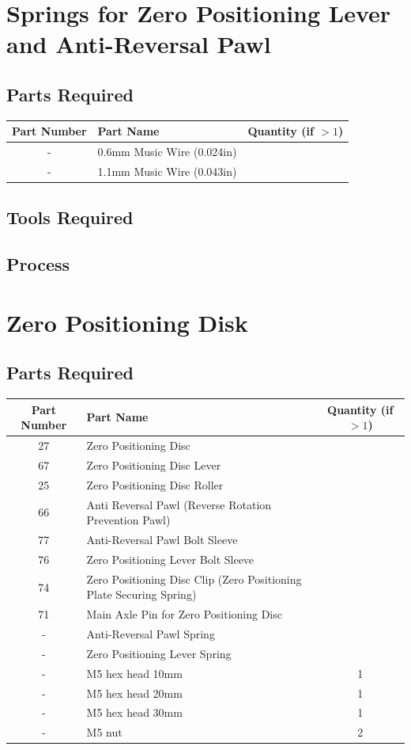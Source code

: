 \documentclass{article}
\begin{document}
\newpage
\section{Springs for Zero Positioning Lever and Anti-Reversal Pawl}
\subsection{Parts Required}
\begin{table}[h!]
	\centering
	\begin{tabular}{clc}
		Part Number & Part Name & Quantity (if $>1$) \\ \hline
		- & 0.6mm Music Wire (0.024in) & \\
		- & 1.1mm Music Wire (0.043in) & 
	\end{tabular}
\end{table}



\subsection{Tools Required}

\subsection{Process}



\newpage
\section{Zero Positioning Disk}
\subsection{Parts Required}

\begin{table}[h!]
	\centering
	\begin{tabular}{clc}
		Part Number & Part Name & Quantity (if $>1$) \\ \hline
		27 & Zero Positioning Disc & \\
		67 & Zero Positioning Disc Lever & \\
		25 & Zero Positioning Disc Roller & \\
		66 & Anti Reversal Pawl (Reverse Rotation Prevention Pawl) & \\
		77 & Anti-Reversal Pawl Bolt Sleeve & \\
		76 & Zero Positioning Lever Bolt Sleeve & \\
		74 & Zero Positioning Disc Clip (Zero Positioning Plate Securing Spring) & \\
		71 & Main Axle Pin for Zero Positioning Disc & \\ \hline \hline
		- & Anti-Reversal Pawl Spring & \\
		- & Zero Positioning Lever Spring & \\ \hline \hline
		- & M5 hex head 10mm & 1 \\
		- & M5 hex head 20mm & 1 \\
		- & M5 hex head 30mm & 1 \\
		- & M5 nut & 2
	\end{tabular}
\end{table}
\end{document}
